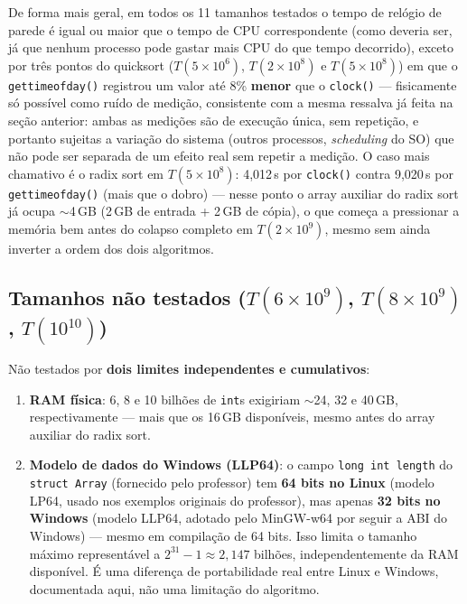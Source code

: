 \documentclass[11pt,a4paper]{article}
\renewcommand{\_}{\underscoreoriginal\allowbreak}
\begin{document}
De forma mais geral, em todos os 11 tamanhos testados o tempo de
relógio de parede é igual ou maior que o tempo de CPU correspondente
(como deveria ser, já que nenhum processo pode gastar mais CPU do que
tempo decorrido), exceto por três pontos do quicksort
($T(5\times10^6)$, $T(2\times10^8)$ e $T(5\times10^8)$) em que o
\texttt{gettimeofday()} registrou um valor até 8\% \textbf{menor} que o
\texttt{clock()} --- fisicamente só possível como ruído de medição,
consistente com a mesma ressalva já feita na seção anterior: ambas as
medições são de execução única, sem repetição, e portanto sujeitas a
variação do sistema (outros processos, \emph{scheduling} do SO) que não
pode ser separada de um efeito real sem repetir a medição. O caso mais
chamativo é o radix sort em $T(5\times10^8)$: 4,012\,s por \texttt{clock()}
contra 9,020\,s por \texttt{gettimeofday()} (mais que o dobro) --- nesse
ponto o array auxiliar do radix sort já ocupa $\sim$4\,GB (2\,GB de
entrada + 2\,GB de cópia), o que começa a pressionar a memória bem
antes do colapso completo em $T(2\times10^9)$, mesmo sem ainda inverter
a ordem dos dois algoritmos.

\subsection{Tamanhos não testados ($T(6\times10^9)$, $T(8\times10^9)$, $T(10^{10})$)}

Não testados por \textbf{dois limites independentes e cumulativos}:

\begin{enumerate}
  \item \textbf{RAM física}: 6, 8 e 10 bilhões de \texttt{int}s exigiriam
    $\sim$24, 32 e 40\,GB, respectivamente --- mais que os 16\,GB
    disponíveis, mesmo antes do array auxiliar do radix sort.
  \item \textbf{Modelo de dados do Windows (LLP64)}: o campo
    \texttt{long int length} do \texttt{struct Array} (fornecido pelo
    professor) tem \textbf{64 bits no Linux} (modelo LP64, usado nos
    exemplos originais do professor), mas apenas \textbf{32 bits no
    Windows} (modelo LLP64, adotado pelo MinGW-w64 por seguir a ABI do
    Windows) --- mesmo em compilação de 64 bits. Isso limita o tamanho
    máximo representável a $2^{31}-1 \approx 2{,}147$ bilhões,
    independentemente da RAM disponível. É uma diferença de
    portabilidade real entre Linux e Windows, documentada aqui, não uma
    limitação do algoritmo.
\end{enumerate}
\end{document}
